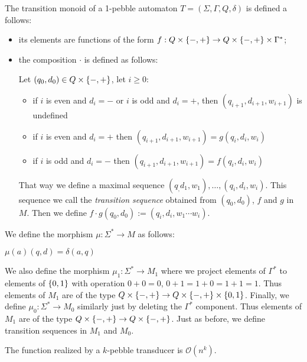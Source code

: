 \begin{definition}
The transition monoid of a 1-pebble automaton $T=(\Sigma,\Gamma,Q, \delta)$ is defined a follows:
\begin{itemize}
\item its elements are functions of the form $f:Q\times\{{-},{+}\}\to Q\times\{{-},{+}\}\times \Gamma^*$;
\item the composition $\cdot$ is defined as follows:

Let $(q_0,d_0)\in Q\times \{{-},{+}\}$, let $i\geq 0$:
\begin{itemize}
\item if $i$ is even and $d_i={-}$ or $i$ is odd and $d_i={+}$, then $(q_{i+1},d_{i+1},w_{i+1})$ is undefined
\item if $i$ is even and $d_i={+}$ then $(q_{i+1},d_{i+1},w_{i+1})=g(q_i,d_i,w_i)$
\item if $i$ is odd and $d_i={-}$ then $(q_{i+1},d_{i+1},w_{i+1})=f(q_i,d_i,w_i)$
\end{itemize}
That way we define a maximal sequence $(q_,d_1,w_1),\ldots,(q_i,d_i,w_i)$.
This sequence we call the \emph{transition sequence} obtained from $(q_0,d_0)$, $f$ and $g$ in $M$.
Then we define $f\cdot g(q_0,d_0):=(q_i,d_i,w_1\cdots w_i)$.

\end{itemize}

We define the morphism $\mu:\Sigma^*\to M$ as follows:

$\mu(a)(q,d)=\delta(a,q)$

We also define the morphism $\mu_1:\Sigma^*\to M_1$ where we project elements of $\Gamma^*$ to elements of $\{0,1\}$ with operation $0+0=0$, $0+1=1+0=1+1=1$. Thus elements of $M_1$ are of the type $Q\times\{{-},{+}\}\to Q\times\{{-},{+}\}\times \{0,1\}$.
Finally, we define $\mu_0:\Sigma^*\to M_0$ similarly just by deleting the $\Gamma^*$ component.
Thus elements of $M_1$ are of the type $Q\times\{{-},{+}\}\to Q\times\{{-},{+}\}$.
Just as before, we define transition sequences in $M_1$ and $M_0$.
\end{definition}


\begin{proposition}[\cite{}]
The function realized by a $k$-pebble transducer is $\mathcal{O}(n^k)$.
\end{proposition}